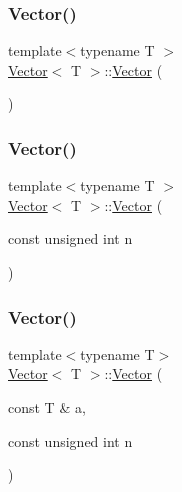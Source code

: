 \subsubsection{\texorpdfstring{Vector()}{Vector()}\hspace{0.1cm}{\footnotesize\ttfamily [1/5]}}
{\footnotesize\ttfamily template$<$typename T $>$ \\
\mbox{\hyperlink{classVector}{Vector}}$<$ T $>$\+::\mbox{\hyperlink{classVector}{Vector}} (\begin{DoxyParamCaption}{ }\end{DoxyParamCaption})}

\mbox{\label{classVector_a8575836acd6e8c9a2297b5ba6d14008c}} 
\subsubsection{\texorpdfstring{Vector()}{Vector()}\hspace{0.1cm}{\footnotesize\ttfamily [2/5]}}
{\footnotesize\ttfamily template$<$typename T $>$ \\
\mbox{\hyperlink{classVector}{Vector}}$<$ T $>$\+::\mbox{\hyperlink{classVector}{Vector}} (\begin{DoxyParamCaption}\item[{const unsigned int}]{n }\end{DoxyParamCaption})}

\mbox{\label{classVector_aa2bc8aac00503574bac8302652ef7ba0}} 
\subsubsection{\texorpdfstring{Vector()}{Vector()}\hspace{0.1cm}{\footnotesize\ttfamily [3/5]}}
{\footnotesize\ttfamily template$<$typename T$>$ \\
\mbox{\hyperlink{classVector}{Vector}}$<$ T $>$\+::\mbox{\hyperlink{classVector}{Vector}} (\begin{DoxyParamCaption}\item[{const T \&}]{a,  }\item[{const unsigned int}]{n }\end{DoxyParamCaption})}

\mbox{\label{classVector_a62f06e9931e61437a5a5783eca0a9550}} 
